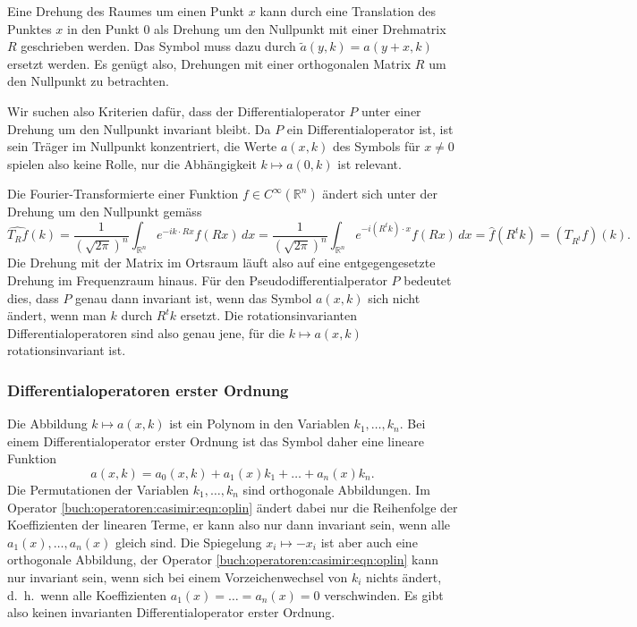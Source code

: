 Eine Drehung des Raumes um einen Punkt $x$ kann durch eine Translation
des Punktes $x$ in den Punkt $0$ als Drehung um den Nullpunkt
mit einer Drehmatrix $R$ geschrieben werden.
Das Symbol muss dazu durch $\tilde{a}(y,k) = a(y+x,k)$ ersetzt werden.
Es genügt also, Drehungen mit einer orthogonalen Matrix $R$ um den
Nullpunkt zu betrachten.

Wir suchen also Kriterien dafür, dass der Differentialoperator $P$ unter
einer Drehung um den Nullpunkt invariant bleibt.
Da $P$ ein Differentialoperator ist, ist sein Träger im Nullpunkt
konzentriert, die Werte $a(x,k)$ des Symbols für $x\ne 0$ spielen also
keine Rolle, nur die Abhängigkeit $k\mapsto a(0,k)$ ist relevant.

Die Fourier-Transformierte einer Funktion $f\in C^{\infty}(\mathbb{R}^n)$
ändert sich unter der Drehung um den Nullpunkt gemäss
\[
\widehat{T_Rf}(k)
=
\frac{1}{(\!\sqrt{2\pi})^n}
\int_{\mathbb{R}^n}
e^{-ik\cdot Rx}
f(Rx)\,dx
=
\frac{1}{(\!\sqrt{2\pi})^n}
\int_{\mathbb{R}^n}
e^{-i(R^tk)\cdot x}
f(Rx)\,dx
=
\hat{f}(R^tk)
=
(T_{R^t}f)(k).
\]
Die Drehung mit der Matrix im Ortsraum läuft also auf eine entgegengesetzte
Drehung im Frequenzraum hinaus.
Für den Pseudodifferentialperator $P$ bedeutet dies, dass $P$ genau dann
invariant ist, wenn das Symbol $a(x,k)$ sich nicht ändert, wenn man $k$ durch
$R^tk$ ersetzt.
Die rotationsinvarianten Differentialoperatoren sind also genau jene, 
für die $k\mapsto a(x,k)$ rotationsinvariant ist.

%
%
\subsubsection{Differentialoperatoren erster Ordnung}
Die Abbildung $k\mapsto a(x,k)$ ist ein Polynom in den Variablen
$k_1,\dots,k_n$.
Bei einem Differentialoperator erster Ordnung ist das Symbol daher
eine lineare Funktion
\begin{equation}
a(x,k)
=
a_0(x,k)
+
a_1(x)k_1
+
\dots
+
a_n(x)k_n.
\label{buch:operatoren:casimir:eqn:oplin}
\end{equation}
Die Permutationen der Variablen $k_1,\dots,k_n$ sind orthogonale Abbildungen.
Im Operator \eqref{buch:operatoren:casimir:eqn:oplin} ändert dabei nur
die Reihenfolge der Koeffizienten der linearen Terme, er kann also nur dann
invariant sein, wenn alle $a_1(x),\dots,a_n(x)$ gleich sind.
Die Spiegelung $x_i\mapsto -x_i$ ist aber auch eine orthogonale Abbildung,
der Operator \eqref{buch:operatoren:casimir:eqn:oplin} kann nur invariant
sein, wenn sich bei einem Vorzeichenwechsel von $k_i$ nichts ändert,
d.~h.~wenn alle Koeffizienten $a_1(x)=\dots = a_n(x)=0$ verschwinden.
Es gibt also keinen invarianten Differentialoperator erster Ordnung.

